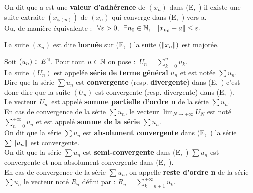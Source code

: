 \vspace{1cm}

On dit que a est une \textbf{valeur d'adhérence} de \((x_n)\) dans (E,\ \normtxt{\ }) \ssi il existe une suite extraite \(\left(x_{\varphi (n)}\right)\) de \((x_n)\) qui converge dans (E,\ \normtxt{\ }) vers a.\vspace{0.1cm}\\
Ou, de manière équivalente : \(\displaystyle\ \forall \varepsilon >0,\ \,\exists n_0\in \NN,\ \ \norm{x_{n_0}-a}\leq \varepsilon.\)

\vspace{1cm}

La suite \((x_n)\) est dite \textbf{bornée} sur (E,\ \normtxt{\ }) \ssi la suite \((\left\lVert x_n\right\rVert)\) est majorée.

\vspace{1cm}

Soit \((u_n)\in E^{\mathbb{N}}\). Pour tout \(n\in \mathbb{N}\) on pose : \(\ \displaystyle U_n=\sum_{k=0}^nu_k.\)\vspace{0.2cm}\\
La suite \((U_n)\) est appelée \textbf{série de terme général} \(u_n\) et est notée \(\sum u_n\).\vspace{0.1cm}\\
Dire que la série \(\sum u_n\) est \textbf{convergente} (resp. \textbf{divergente}) dans (E,\ \normtxt{\ }) c'est donc dire que la suite \((U_n)\) est convergente (resp. divergente) dans (E,\ \normtxt{\ }).\vspace{0.3cm}\\
Le vecteur \(\,U_n\,\) est appelé \textbf{somme partielle d'ordre n} de la série \(\sum u_n\).\vspace{0.6cm}\\
En cas de convergence de la série \(\sum u_n\), le vecteur \(\displaystyle \lim_{N\to +\infty}U_N\) est noté \(\displaystyle \sum_{n=0}^{+\infty}u_n\) et est appelé \textbf{somme de la série} \(\sum u_n\).\vspace{1cm}\\
On dit que la série \(\sum u_n\) est \textbf{absolument convergente} dans (E,\ \normtxt{\ }) \ssi la série \(\sum \left\lVert u_n\right\rVert\) est convergente.\vspace{0.1cm}\\
On dit que la série \(\sum u_n\) est \textbf{semi-convergente} dans (E,\ \normtxt{\ }) \ssi \(\sum u_n\) est convergente et non absolument convergente dans (E,\ \normtxt{\ }).\vspace{1cm}\\
En cas de convergence de la série \(\sum u_n\), on appelle \textbf{reste d'ordre n} de la série \(\sum u_n\) le vecteur noté \(R_n\) défini par : \(\displaystyle R_n =\sum_{k=n+1}^{+\infty}u_k. \)

